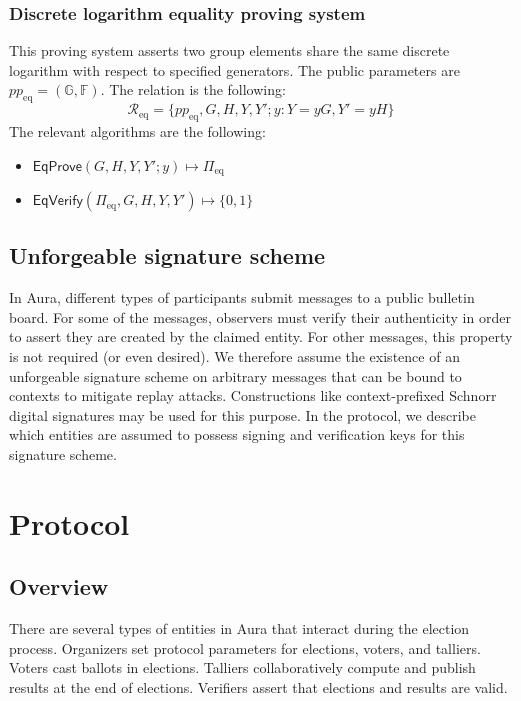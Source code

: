 \documentclass{llncs}
\newcommand{\G}{\mathbb{G}}
\newcommand{\F}{\mathbb{F}}
\newcommand{\func}[1]{\mathsf{#1}}
\begin{document}
\subsubsection{Discrete logarithm equality proving system}

This proving system asserts two group elements share the same discrete logarithm with respect to specified generators.
The public parameters are $pp_{\text{eq}} = (\G, \F)$.
The relation is the following:
\[ \mathcal{R}_{\text{eq}} = \{ pp_{\text{eq}}, G, H, Y, Y' ; y : Y = yG, Y' = yH \} \]
The relevant algorithms are the following:
\begin{itemize}
    \item $\func{EqProve}(G, H, Y, Y' ; y) \mapsto \Pi_{\text{eq}}$
    \item $\func{EqVerify}(\Pi_{\text{eq}}, G, H, Y, Y') \mapsto \{0, 1\}$
\end{itemize}


\subsection{Unforgeable signature scheme}

In Aura, different types of participants submit messages to a public bulletin board.
For some of the messages, observers must verify their authenticity in order to assert they are created by the claimed entity.
For other messages, this property is not required (or even desired).
We therefore assume the existence of an unforgeable signature scheme on arbitrary messages that can be bound to contexts to mitigate replay attacks.
Constructions like context-prefixed Schnorr digital signatures may be used for this purpose.
In the protocol, we describe which entities are assumed to possess signing and verification keys for this signature scheme.


\section{Protocol}


\subsection{Overview}

There are several types of entities in Aura that interact during the election process.
Organizers set protocol parameters for elections, voters, and talliers.
Voters cast ballots in elections.
Talliers collaboratively compute and publish results at the end of elections.
Verifiers assert that elections and results are valid.
\end{document}
